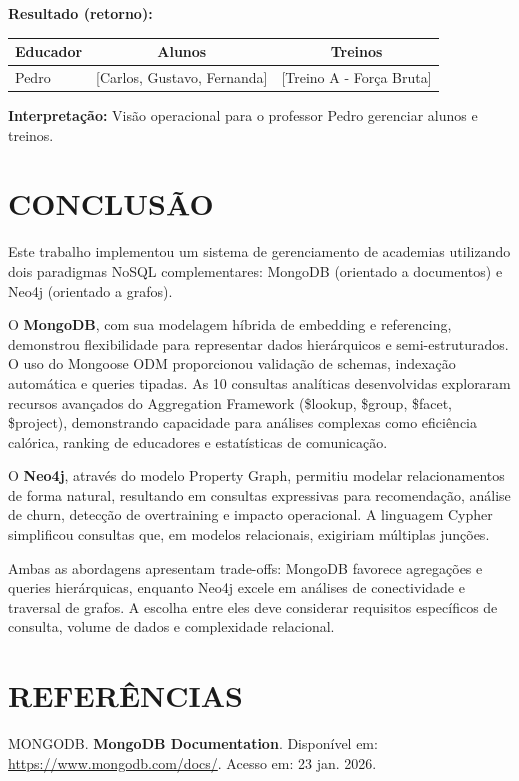 \documentclass[12pt,a4paper]{article}
\begin{document}
\textbf{Resultado (retorno):}
\begin{table}[h]
\centering
\begin{tabular}{lcc}
\toprule
Educador & Alunos & Treinos \\
\midrule
Pedro & [Carlos, Gustavo, Fernanda] & [Treino A - Força Bruta] \\
\bottomrule
\end{tabular}
\end{table}

\textbf{Interpretação:} Visão operacional para o professor Pedro gerenciar alunos e treinos.

\section{CONCLUSÃO}

Este trabalho implementou um sistema de gerenciamento de academias utilizando dois paradigmas NoSQL complementares: MongoDB (orientado a documentos) e Neo4j (orientado a grafos).

O \textbf{MongoDB}, com sua modelagem híbrida de embedding e referencing, demonstrou flexibilidade para representar dados hierárquicos e semi-estruturados. O uso do Mongoose ODM proporcionou validação de schemas, indexação automática e queries tipadas. As 10 consultas analíticas desenvolvidas exploraram recursos avançados do Aggregation Framework (\$lookup, \$group, \$facet, \$project), demonstrando capacidade para análises complexas como eficiência calórica, ranking de educadores e estatísticas de comunicação.

O \textbf{Neo4j}, através do modelo Property Graph, permitiu modelar relacionamentos de forma natural, resultando em consultas expressivas para recomendação, análise de churn, detecção de overtraining e impacto operacional. A linguagem Cypher simplificou consultas que, em modelos relacionais, exigiriam múltiplas junções.

Ambas as abordagens apresentam trade-offs: MongoDB favorece agregações e queries hierárquicas, enquanto Neo4j excele em análises de conectividade e traversal de grafos. A escolha entre eles deve considerar requisitos específicos de consulta, volume de dados e complexidade relacional.

\section{REFERÊNCIAS}

MONGODB. \textbf{MongoDB Documentation}. Disponível em: \url{https://www.mongodb.com/docs/}. Acesso em: 23 jan. 2026.
\end{document}
